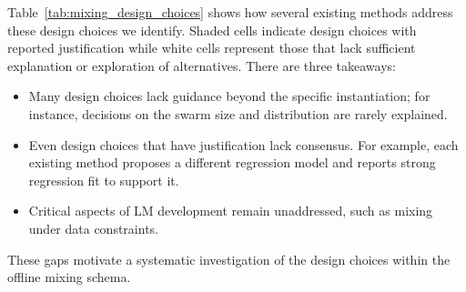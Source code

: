 \documentclass[table]{ai2style/ai2}
\begin{document}
Table~\ref{tab:mixing_design_choices} shows how several existing methods address these design choices we identify. Shaded cells indicate design choices with reported justification while white cells represent those that lack sufficient explanation or exploration of alternatives. There are three takeaways:
\begin{itemize}[itemsep=0.00pt,topsep=0pt,leftmargin=12pt]
\item Many design choices lack guidance beyond the specific
instantiation; for instance, decisions on the swarm size
and distribution are rarely explained.
\item Even design choices that have justification lack consensus. For example, each existing method proposes a different regression model and reports strong regression fit to support it.
\item Critical aspects of LM development remain unaddressed, such as mixing under data constraints.
\end{itemize}

These gaps motivate a systematic investigation of the design choices within the offline mixing schema. 
\end{document}
